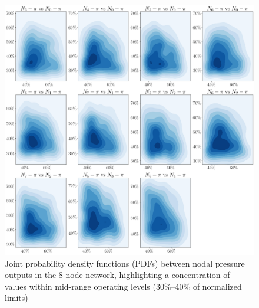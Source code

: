 \begin{figure}[H]
    \begin{center}
        \includegraphics[width=.7\textwidth]{figures/Chapter_NonLinealCensnet/outputs_outputs_3.png}
    \end{center}
    \caption{Joint probability density functions (PDFs) between nodal pressure outputs in the 8-node network, highlighting a concentration of values within mid-range operating levels (30\%–40\% of normalized limits)}
    \label{fig:joint_distributions_output_output_3}
\end{figure}
 


